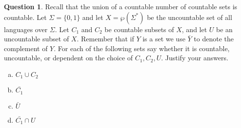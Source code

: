 \documentclass{article}
\theoremstyle{definition}
\newtheorem{Q}{Question}
\begin{document}
\begin{Q}
Recall that the union of a countable number of countable sets is countable. Let $\Sigma=\{0,1\}$ and let $X=\wp(\Sigma^*)$ be the uncountable set of all languages over $\Sigma$. Let $C_1$ and $C_2$ be countable subsets of $X$, and let $U$ be an uncountable subset of $X$. Remember that if $Y$ is a set we use $\bar{Y}$ to denote the complement of $Y$. For each of the following sets say whether it is countable, uncountable, or dependent on the choice of $C_1,C_2,U$. Justify your answers.
\begin{enumerate}[(a)]
\item$C_1\cup C_2$
\item$\bar{C_1}$
\item$\bar{U}$
\item$\bar{C_1}\cap U$
\end{enumerate} 
\end{Q}
\begin{comment}
\textbf{Solution}
\begin{enumerate}[(a)]
\item This is countable as the union of a countable number of countable sets is always countable.
\item This must be uncountable, as $C_1\cup \bar{C}_1 = X$. By part (a), if both $C_1$ and $\bar{C}_1$ were countable then $X$ would be too, but $X$ is uncountable. So, since $C_1$ is countable, $\bar{C}_1$ must be uncountable.
\item This depends on the choice of $U$. If $U = X$ then $\bar{U} = \emptyset$, which is countable. Alternatively, let $U$ be the set of all languages containing the string $s$, for some arbitrary choice of $s$. Then $U$ is in bijection with $\wp(\Sigma^*\setminus\{s\})$, which is uncountable for the same reason $\wp(\Sigma^*)$ is. This bijection takes a language $L\in U$ to $L\setminus\{s\}$, which is in $\wp(\Sigma^*\setminus\{s\})$, and conversely takes $L'\in\wp(\Sigma^*\setminus\{s\})$ to $L'\cup\{s\}$, which is in $U$. Moreover, $\bar{U} = \wp(\Sigma^*\setminus\{s\})$, and so is also uncountable.   
\item This is uncountable, for the following reason.
\begin{align*}
U &= X \cap U \\
&=(\bar{C}_1\cup C_1)\cap U \\
&= (\bar{C}_1 \cap U) \cup (C_1\cap U).
\end{align*}
Now, $(C_1\cap U)$ is countable, so $(\bar{C}_1 \cap U)$ must be uncountable as $U$ is. This last step is essentially the same argument we used in part (b).
\end{enumerate}
\end{comment}
\end{document}
